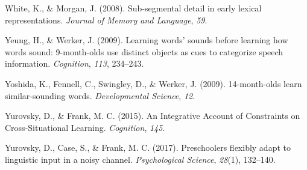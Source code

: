 \documentclass[english,floatsintext,man]{apa6}
\theoremstyle{definition}
\theoremstyle{definition}
\theoremstyle{definition}
\theoremstyle{remark}
\begin{document}
\hypertarget{ref-white2008b}{}
White, K., \& Morgan, J. (2008). Sub-segmental detail in early lexical
representations. \emph{Journal of Memory and Language}, \emph{59}.

\hypertarget{ref-yeung09}{}
Yeung, H., \& Werker, J. (2009). Learning words' sounds before learning
how words sound: 9-month-olds use distinct objects as cues to categorize
speech information. \emph{Cognition}, \emph{113}, 234--243.

\hypertarget{ref-yoshida2009}{}
Yoshida, K., Fennell, C., Swingley, D., \& Werker, J. (2009).
14-month-olds learn similar-sounding words. \emph{Developmental
Science}, \emph{12}.

\hypertarget{ref-yurovsky2015}{}
Yurovsky, D., \& Frank, M. C. (2015). An Integrative Account of
Constraints on Cross-Situational Learning. \emph{Cognition}, \emph{145}.

\hypertarget{ref-yurovsky2017}{}
Yurovsky, D., Case, S., \& Frank, M. C. (2017). Preschoolers flexibly
adapt to linguistic input in a noisy channel. \emph{Psychological
Science}, \emph{28}(1), 132--140.
\end{document}
